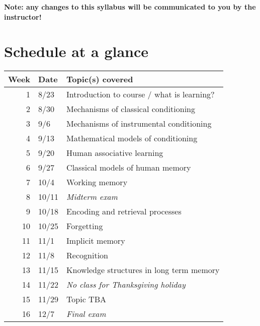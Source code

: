 \documentclass[10pt]{article}
\begin{document}
\textbf{Note:  any changes to this syllabus will be communicated to you by the instructor!}

\section*{Schedule at a glance}
\label{sec:org4c835a2}

\begin{center}
\begin{tabular}{rll}
Week & Date & Topic(s) covered\\
\hline
1 & 8/23 & Introduction to course / what is learning?\\
2 & 8/30 & Mechanisms of classical conditioning\\
3 & 9/6 & Mechanisms of instrumental conditioning\\
4 & 9/13 & Mathematical models of conditioning\\
5 & 9/20 & Human associative learning\\
6 & 9/27 & Classical models of human memory\\
7 & 10/4 & Working memory\\
8 & 10/11 & \emph{Midterm exam}\\
9 & 10/18 & Encoding and retrieval processes\\
10 & 10/25 & Forgetting\\
11 & 11/1 & Implicit memory\\
12 & 11/8 & Recognition\\
13 & 11/15 & Knowledge structures in long term memory\\
14 & 11/22 & \emph{No class for Thanksgiving holiday}\\
15 & 11/29 & Topic TBA\\
16 & 12/7 & \emph{Final exam}\\
\end{tabular}
\end{center}
\end{document}
